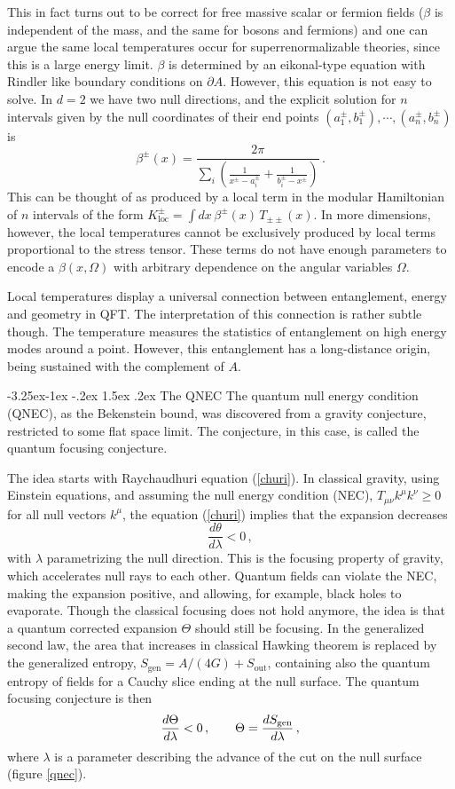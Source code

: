 \documentclass[11pt]{article}
\makeatletter
\renewcommand\subsection{\@startsection{subsection}{2}{\z@}%
                                   {-3.25ex\@plus -1ex \@minus -.2ex}%
                                     {1.5ex \@plus .2ex}%
                                     {\normalfont\bfseries}}
\numberwithin{equation}{section}
\newcommand{\be}{\begin{equation}}
\newcommand{\ee}{\end{equation}}
\makeatother
\begin{document}
This in fact turns out to be correct for free massive scalar or fermion fields  ($\beta$ is independent of the mass, and the same for bosons and fermions) and one can argue the same local temperatures occur for superrenormalizable theories, since this is a large energy limit. $\beta$ is determined by an eikonal-type equation with Rindler like boundary conditions on $\partial A$. However, this equation is not easy to solve. In $d=2$ we have two null directions, and the explicit solution for $n$ intervals given by the null coordinates of their end points $(a_1^\pm,b_1^\pm),\cdots, (a_n^\pm,b_n^\pm)$ is
\be
\beta^\pm(x)=\frac{2\pi}{\sum_i \left(\frac{1}{x^\pm-a_i^\pm}+\frac{1}{b_i^\pm-x^\pm}\right)}\,.  
\ee
This can be thought of as produced by a local term in the modular Hamiltonian of $n$ intervals of the form $K^\pm_{\textrm{loc}}= \int dx\, \beta^\pm(x)\, T_{\pm\pm}(x)$. In more dimensions, however, the local temperatures cannot be exclusively produced by local terms proportional to the stress tensor. These terms do not have enough parameters to encode a $\beta(x,\Omega)$ with arbitrary dependence on the angular variables $\Omega$. 

Local temperatures display a universal connection between entanglement, energy and geometry in QFT. The interpretation of this connection is rather subtle though. The temperature measures the statistics of entanglement on high energy modes around a point. However, this entanglement has a long-distance origin, being sustained with the complement of $A$.     

\subsection{The QNEC}
The quantum null energy condition (QNEC), as the Bekenstein bound, was discovered from a gravity conjecture, restricted to some flat space limit. The conjecture, in this case, is called the quantum focusing conjecture. 

The idea starts with Raychaudhuri equation (\ref{churi}). In classical gravity, using Einstein equations, and assuming the null energy condition (NEC), $T_{\mu\nu}k^\mu k^\nu\ge 0$ for all null vectors $k^\mu$, the equation (\ref{churi}) implies that the expansion decreases
\be
\frac{d\theta}{d\lambda}<0\,,
\ee
with $\lambda$ parametrizing the null direction. 
 This is the focusing property of gravity, which accelerates null rays to each other. Quantum fields can violate the NEC, making the expansion positive, and allowing, for example, black holes to evaporate. Though the classical focusing does not hold anymore, the idea is that a quantum corrected expansion $\Theta$ should still be focusing. In the generalized second law, the area that increases in classical Hawking theorem is replaced by the generalized entropy, $S_{\textrm{gen}}=A/(4G)+S_{\textrm{out}}$, containing also the quantum entropy of fields for a Cauchy slice ending at the null surface. The quantum focusing conjecture is then
 \be
 \frac{d\Theta}{d\lambda}<0\,,\hspace{.7cm} \Theta= \frac{dS_{\textrm{gen}}}{d\lambda}\,,   
\ee
where $\lambda$ is a parameter describing the advance of the cut on the null surface (figure \ref{qnec}). 
\end{document}
